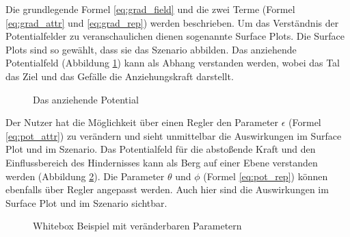 Die grundlegende Formel \ref{eq:grad_field} und die zwei Terme (Formel \ref{eq:grad_attr} und \ref{eq:grad_rep}) werden beschrieben.
Um das Verständnis der Potentialfelder zu veranschaulichen dienen sogenannte Surface Plots. Die Surface Plots sind so gewählt, dass sie das Szenario abbilden. Das anziehende Potentialfeld (Abbildung \ref{fig:surf_attr}) kann als Abhang verstanden werden, wobei das Tal das Ziel und das Gefälle die Anziehungskraft darstellt.
\begin{figure}[h!]
  \centering
  \caption{Das anziehende Potential}
  \label{fig:surf_attr}
\end{figure}
Der Nutzer hat die Möglichkeit über einen Regler den Parameter $\epsilon$ (Formel \ref{eq:pot_attr}) zu verändern und sieht unmittelbar die Auswirkungen im Surface Plot und im Szenario. 
Das Potentialfeld für die abstoßende Kraft und den Einflussbereich des Hindernisses kann als Berg auf einer Ebene verstanden werden (Abbildung \ref{fig:surf_rep}). Die Parameter $\theta$ und $\phi$ (Formel \ref{eq:pot_rep}) können ebenfalls über Regler angepasst werden. Auch hier sind die Auswirkungen im Surface Plot und im Szenario sichtbar.
\begin{figure}[h!]
  \centering
  \caption{Whitebox Beispiel mit veränderbaren Parametern}
  \label{fig:surf_rep}
\end{figure}
